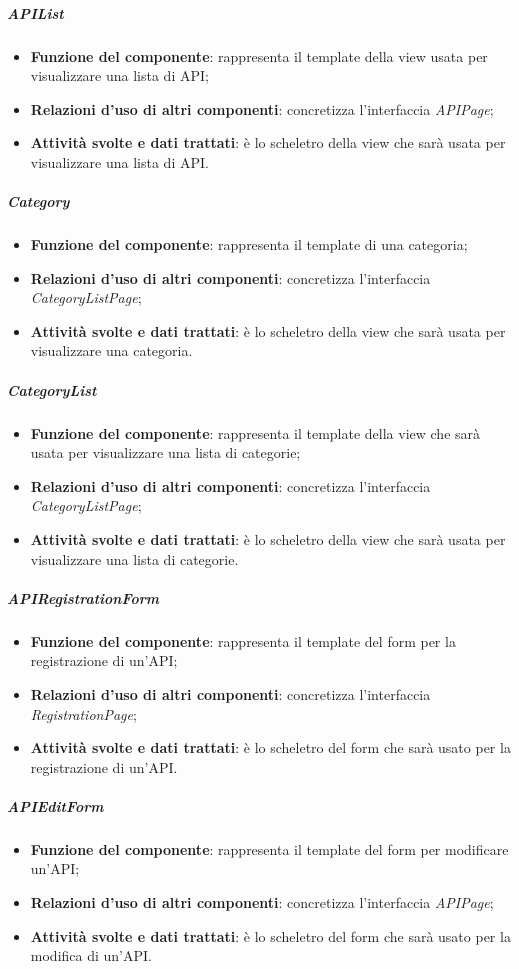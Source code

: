\subparagraph{APIList}
\begin{itemize}
	\item \textbf{Funzione del componente}: rappresenta il template della view usata per visualizzare una lista di API;
	\item \textbf{Relazioni d'uso di altri componenti}: concretizza l'interfaccia \textit{APIPage};
	\item \textbf{Attività svolte e dati trattati}: è lo scheletro della view che sarà usata per visualizzare una lista di API.
\end{itemize}

\subparagraph{Category}
\begin{itemize}
	\item \textbf{Funzione del componente}: rappresenta il template di una categoria;
	\item \textbf{Relazioni d'uso di altri componenti}: concretizza l'interfaccia \textit{CategoryListPage};
	\item \textbf{Attività svolte e dati trattati}: è lo scheletro della view che sarà usata per visualizzare una categoria.
\end{itemize}

\subparagraph{CategoryList}
\begin{itemize}
	\item \textbf{Funzione del componente}: rappresenta il template della view che sarà usata per visualizzare una lista di categorie;
	\item \textbf{Relazioni d'uso di altri componenti}: concretizza l'interfaccia \textit{CategoryListPage};
	\item \textbf{Attività svolte e dati trattati}: è lo scheletro della view che sarà usata per visualizzare una lista di categorie.
\end{itemize}

\subparagraph{APIRegistrationForm}
\begin{itemize}
	\item \textbf{Funzione del componente}: rappresenta il template del form per la registrazione di un'API;
	\item \textbf{Relazioni d'uso di altri componenti}: concretizza l'interfaccia \textit{RegistrationPage};
	\item \textbf{Attività svolte e dati trattati}: è lo scheletro del form che sarà usato per la registrazione di un'API.
\end{itemize}

\subparagraph{APIEditForm}
\begin{itemize}
	\item \textbf{Funzione del componente}: rappresenta il template del form per modificare un'API;
	\item \textbf{Relazioni d'uso di altri componenti}: concretizza l'interfaccia \textit{APIPage};
	\item \textbf{Attività svolte e dati trattati}: è lo scheletro del form che sarà usato per la modifica di un'API.
\end{itemize}

